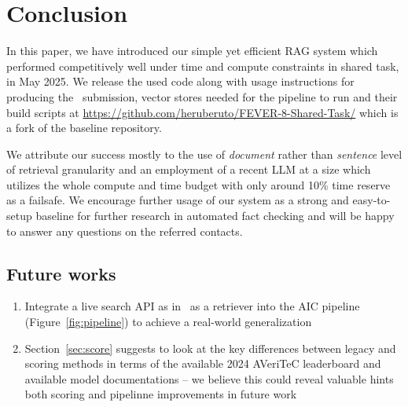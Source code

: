 
\section{Conclusion}
\label{sec:conclusion}
In this paper, we have introduced our simple yet efficient RAG system which performed competitively well under time and compute constraints in \averitec{} shared task, in May 2025.
We release the used code along with usage instructions for producing the~\averitec{} submission, vector stores needed for the pipeline to run and their build scripts at 
\url{https://github.com/heruberuto/FEVER-8-Shared-Task/}
which is a fork of the \averitec{} baseline repository.

We attribute our success mostly to the use of \textit{document} rather than \textit{sentence} level of retrieval granularity and an employment of a recent LLM at a size which utilizes the whole compute and time budget with only around 10\% time reserve as a failsafe.
We encourage further usage of our system as a strong and easy-to-setup baseline for further research in automated fact checking and will be happy to answer any questions on the referred contacts.

\subsection{Future works}
\begin{enumerate}
    \item Integrate a live search API as in~\cite{malon-2024-multi} as a retriever into the AIC pipeline (Figure~\ref{fig:pipeline}) to achieve a real-world generalization
    \item Section~\ref{sec:score} suggests to look at the key differences between legacy and \evr{} scoring methods in terms of the available 2024 AVeriTeC leaderboard and available model documentations -- we believe this could reveal valuable hints both scoring and pipelinne improvements in future work
\end{enumerate}
